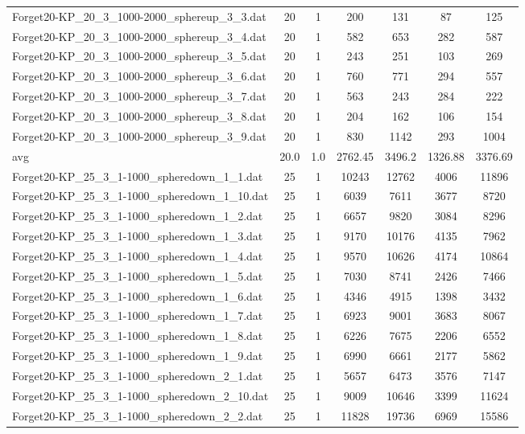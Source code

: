 \begin{table}[!ht]
\begin{tabular}{lcccccc}
Forget20-KP\_20\_3\_1000-2000\_sphereup\_3\_3.dat & 20 & 1 & 200 & 131 & 87 & 125 \\
Forget20-KP\_20\_3\_1000-2000\_sphereup\_3\_4.dat & 20 & 1 & 582 & 653 & 282 & 587 \\
Forget20-KP\_20\_3\_1000-2000\_sphereup\_3\_5.dat & 20 & 1 & 243 & 251 & 103 & 269 \\
Forget20-KP\_20\_3\_1000-2000\_sphereup\_3\_6.dat & 20 & 1 & 760 & 771 & 294 & 557 \\
Forget20-KP\_20\_3\_1000-2000\_sphereup\_3\_7.dat & 20 & 1 & 563 & 243 & 284 & 222 \\
Forget20-KP\_20\_3\_1000-2000\_sphereup\_3\_8.dat & 20 & 1 & 204 & 162 & 106 & 154 \\
Forget20-KP\_20\_3\_1000-2000\_sphereup\_3\_9.dat & 20 & 1 & 830 & 1142 & 293 & 1004 \\
\cline{1-9} avg & 20.0 & 1.0 & 2762.45& 3496.2 & 1326.88& 3376.69\\ \hline
Forget20-KP\_25\_3\_1-1000\_spheredown\_1\_1.dat & 25 & 1 & 10243 & 12762 & 4006 & 11896 \\
Forget20-KP\_25\_3\_1-1000\_spheredown\_1\_10.dat & 25 & 1 & 6039 & 7611 & 3677 & 8720 \\
Forget20-KP\_25\_3\_1-1000\_spheredown\_1\_2.dat & 25 & 1 & 6657 & 9820 & 3084 & 8296 \\
Forget20-KP\_25\_3\_1-1000\_spheredown\_1\_3.dat & 25 & 1 & 9170 & 10176 & 4135 & 7962 \\
Forget20-KP\_25\_3\_1-1000\_spheredown\_1\_4.dat & 25 & 1 & 9570 & 10626 & 4174 & 10864 \\
Forget20-KP\_25\_3\_1-1000\_spheredown\_1\_5.dat & 25 & 1 & 7030 & 8741 & 2426 & 7466 \\
Forget20-KP\_25\_3\_1-1000\_spheredown\_1\_6.dat & 25 & 1 & 4346 & 4915 & 1398 & 3432 \\
Forget20-KP\_25\_3\_1-1000\_spheredown\_1\_7.dat & 25 & 1 & 6923 & 9001 & 3683 & 8067 \\
Forget20-KP\_25\_3\_1-1000\_spheredown\_1\_8.dat & 25 & 1 & 6226 & 7675 & 2206 & 6552 \\
Forget20-KP\_25\_3\_1-1000\_spheredown\_1\_9.dat & 25 & 1 & 6990 & 6661 & 2177 & 5862 \\
Forget20-KP\_25\_3\_1-1000\_spheredown\_2\_1.dat & 25 & 1 & 5657 & 6473 & 3576 & 7147 \\
Forget20-KP\_25\_3\_1-1000\_spheredown\_2\_10.dat & 25 & 1 & 9009 & 10646 & 3399 & 11624 \\
Forget20-KP\_25\_3\_1-1000\_spheredown\_2\_2.dat & 25 & 1 & 11828 & 19736 & 6969 & 15586 \\

\end{tabular}
\end{table}
